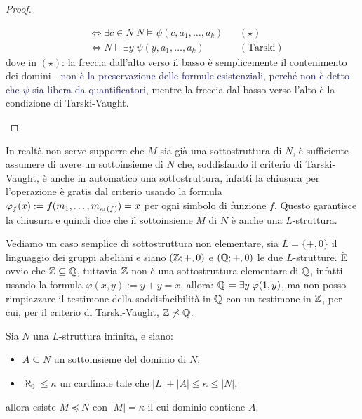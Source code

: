 \begin{proof}
\begin{itemize}
\begin{align*}
                                                          &\iff \exists c \in N \; N \models \psi(c,a_1,\ldots,a_k) &&(\star) \\
                                                          &\iff N \models \exists y \; \psi(y,a_1,\ldots,a_k) &&(\text{Tarski})
        \end{align*}
        dove in $(\star)$: la freccia dall'alto verso il basso è semplicemente il contenimento dei domini \textcolor{MidnightBlue}{- non è la preservazione delle formule esistenziali, perché non è detto che $\psi$ sia libera da quantificatori}, mentre la freccia dal basso verso l'alto è la condizione di Tarski-Vaught.
    \end{itemize}
\end{proof}

\begin{remark}
    In realtà non serve supporre che $M$ sia già una sottostruttura di $N$, è sufficiente assumere di avere un sottoinsieme di $N$ che, soddisfando il criterio di Tarski-Vaught, è anche in automatico una sottostruttura, infatti la chiusura per l'operazione è gratis dal criterio usando la formula
    $\varphi_f(x) := f(m_1,\ldots,m_{\operatorname{ar}(f)}) = x$ per ogni simbolo di funzione $f$. Questo garantisce la chiusura e quindi dice che il sottoinsieme $M$ di $N$ è anche una $L$-struttura.
\end{remark}

\begin{example}
    Vediamo un caso semplice di sottostruttura non elementare, sia $L = \{+,0\}$ il linguaggio dei gruppi abeliani e siano $(\mathbb Z;+,0)$ e $(\mathbb Q;+,0)$ le due $L$-strutture.
    È ovvio che $\mathbb Z \subseteq \mathbb Q$, tuttavia $\mathbb Z$ non è una sottostruttura elementare di $\mathbb Q$, infatti usando la formula $\varphi(x,y) := y + y = x$, allora: $\mathbb Q \models \exists y \; \varphi(1,y)$,
    ma non posso rimpiazzare il testimone della soddisfacibilità in $\mathbb Q$ con un testimone in $\mathbb Z$, per cui, per il criterio di Tarski-Vaught, $\mathbb Z \not \preceq \mathbb Q$.
\end{example}

\begin{theorem}
    Sia $N$ una $L$-struttura infinita, e siano:
    \begin{itemize}
        \item $A \subseteq N$ un sottoinsieme del dominio di $N$,
        \item $\aleph_0 \leq \kappa$ un cardinale tale che $|L| + |A| \leq \kappa \leq |N|$,
    \end{itemize}
    allora esiste $M \preceq N$ con $|M| = \kappa$ il cui dominio contiene $A$.
\end{theorem}

